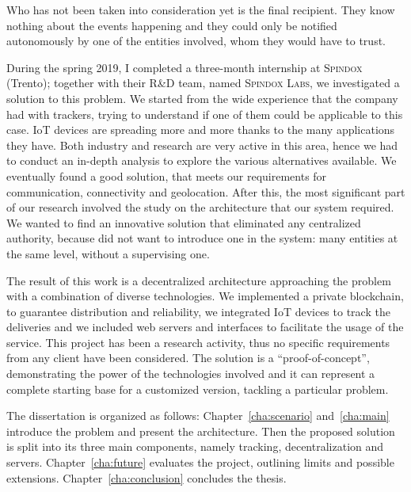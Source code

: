 Who has not been taken into consideration yet is the final recipient. They know nothing about the events happening and they could only be notified autonomously by one of the entities involved, whom they would have to trust. 

During the spring 2019, I completed a three-month internship at \textsc{Spindox} (Trento); together with their R\&D team, named \textsc{Spindox Labs}, we investigated a solution to this problem. We started from the wide experience that the company had with trackers, trying to understand if one of them could be applicable to this case. IoT devices are spreading more and more thanks to the many applications they have. Both industry and research are very active in this area, hence we had to conduct an in-depth analysis to explore the various alternatives available. We eventually found a good solution, that meets our requirements for communication, connectivity and geolocation. After this, the most significant part of our research involved the study on the architecture that our system required. We wanted to find an innovative solution that eliminated any centralized authority, because did not want to introduce one in the system: many entities at the same level, without a supervising one. 

The result of this work is a decentralized architecture approaching the problem with a combination of diverse technologies. We implemented a private blockchain, to guarantee distribution and reliability, we integrated IoT devices to track the deliveries and we included web servers and interfaces to facilitate the usage of the service. This project has been a research activity, thus no specific requirements from any client have been considered. The solution is a ``proof-of-concept'', demonstrating the power of the technologies involved and it can represent a complete starting base for a customized version, tackling a particular problem.

The dissertation is organized as follows: Chapter~\ref{cha:scenario} and~\ref{cha:main} introduce the problem and present the architecture. Then the proposed solution is split into its three main components, namely tracking, decentralization and servers. Chapter~\ref{cha:future} evaluates the project, outlining limits and possible extensions. Chapter~\ref{cha:conclusion} concludes the thesis.

\newpage